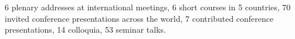 \documentclass[11pt]{article}
\begin{document}
6 plenary addresses at international meetings,
6 short courses in 5 countries,
70 invited conference presentations across the world,
7 contributed conference presentations,
14 colloquia,
53 seminar talks.


\end{document}
